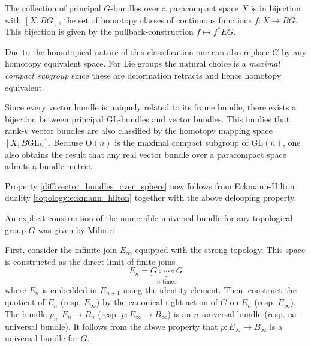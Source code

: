     \begin{property}[Classification]\label{diff:classification}
        The collection of principal $G$-bundles over a paracompact space $X$ is in bijection with $[X, BG]$, the set of homotopy classes of continuous functions $f:X\rightarrow BG$. This bijection is given by the pullback-construction $f\mapsto f^*EG$.

        Due to the homotopical nature of this classification one can also replace $G$ by any homotopy equivalent space. For Lie groups the natural choice is a \textit{maximal compact subgroup} since these are deformation retracts and hence homotopy equivalent.
    \end{property}
    \begin{result}
        Since every vector bundle is uniquely related to its frame bundle, there exists a bijection between principal $\text{GL}$-bundles and vector bundles. This implies that rank-$k$ vector bundles are also classified by the homotopy mapping space $[X,B\text{GL}_k]$. Because $\text{O}(n)$ is the maximal compact subgroup of $\text{GL}(n)$, one also obtains the result that any real vector bundle over a paracompact space admits a bundle metric.

        Property \ref{diff:vector_bundles_over_sphere} now follows from Eckmann-Hilton duality \ref{topology:eckmann_hilton} together with the above delooping property.
    \end{result}


    An explicit construction of the numerable universal bundle for any topological group $G$ was given by Milnor:
    \begin{construct}
        First, consider the infinite join $E_\infty$ equipped with the strong topology. This space is constructed as the direct limit of finite joins \[E_n=\underbrace{G\circ\cdots\circ G}_{n\text{ times}}\] where $E_n$ is embedded in $E_{n+1}$ using the identity element. Then, construct the quotient of $E_n$ (resp. $E_\infty$) by the canonical right action of $G$ on $E_n$ (resp. $E_\infty$). The bundle $p_n:E_n\rightarrow B_n$ (resp. $p:E_\infty\rightarrow B_\infty$) is an $n$-universal bundle (resp. $\infty$-universal bundle). It follows from the above property that $p:E_\infty\rightarrow B_\infty$ is a universal bundle for $G$.
    \end{construct}

